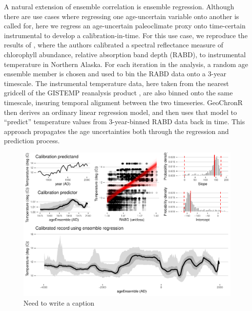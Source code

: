 \documentclass[gchron, manuscript]{copernicus}
\begin{document}
A natural extension of ensemble correlation is ensemble regression.
Although there are use cases where regressing one age-uncertain variable onto another is called for, here we regress an age-uncertain paleoclimate proxy onto time-certain instrumental to develop a calibration-in-time.
For this use case, we reproduce the results of \citet{Boldt:2015}, where the authors calibrated a spectral reflectance measure of chlorophyll abundance, relative absorption band depth (RABD), to instrumental temperature in Northern Alaska.
For each iteration in the analysis, a random age ensemble member is chosen and used to bin the RABD data onto a 3-year timescale.
The instrumental temperature data, here taken from the nearest gridcell of the GISTEMP reanalysis product \citep{GISTEMP}, are also binned onto the same timescale, insuring temporal alignment between the two timeseries.
GeoChronR then derives an ordinary linear regression model, and then uses that model to ``predict'' temperature values from 3-year-binned RABD data back in time.
This approach propagates the age uncertainties both through the regression and prediction process.

\begin{figure}
\includegraphics[width=12cm]{geoChronR-paper_files/figure-latex/regression-1} \caption{Need to write a caption}\label{fig:regression}
\end{figure}
\end{document}
